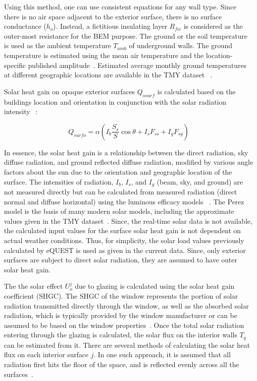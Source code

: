 Using this method, one can use consistent equations for any wall type.  Since there is no air space adjacent to the exterior surface, there is no surface conductance ($h_{o}$). Instead, a fictitious insulating layer $R_{fic}$ is considered as the outer-most resistance for the BEM purpose.
The ground or the soil temperature is used as the ambient temperature $T_{amb}$ of underground walls.  The ground temperature is estimated using the mean air temperature and the location-specific published amplitude~\citep{american20152015}. Estimated average monthly ground temperatures at different geographic locations are available in the TMY dataset ~\citep{marion1995user}.  

Solar heat gain on opaque exterior surfaces $Q_{osurf}$ is calculated based on the buildings location and orientation in conjunction with the solar radiation intensity ~\citep{doe2016energyplus}:  

\begin{equation}
Q_{surfo} = \alpha(I_b\frac{S_s}{S}\cos\theta + I_sF_{ss} + I_gF_{sg})
\end{equation}

In essence, the solar heat gain is a relationship between the direct radiation, sky diffuse radiation, and ground reflected diffuse radiation, modified by various angle factors about the sun due to the orientation and geographic location of the surface. The intensities of radiation, $I_b$, $I_s$, and $I_g$ (beam, sky, and ground) are not measured directly but can be calculated from measured radiation (direct normal and diffuse horizontal) using the luminous efficacy models ~\citep{perez1990modeling}.  The Perez model is the basis of many modern solar models, including the approximate values given in the TMY dataset~\citep{marion1995user}. %
Since, the real-time solar data is not available, the calculated input values for the surface solar heat gain is not dependent on actual weather conditions. Thus, for simplicity, the solar load values previously calculated by eQUEST is used as given in the current data. Since, only exterior surfaces are subject to direct solar radiation, they are assumed to have outer solar heat gain.

The the solar effect $U_o^j$ due to glazing is calculated using the solar heat gain coefficient (SHGC). The SHGC of the window represents the portion of solar radiation transmitted directly through the window, as well as the absorbed solar radiation, which is typically provided by the window manufacturer or can be assumed to be based on the window properties~\citep{american20132013}. Once the total solar radiation entering through the glazing is calculated, the solar flux on the interior walls $T_q$ can be estimated from it. There are several methods of calculating the solar heat flux on each interior surface $j$. In one such approach, it is assumed that all radiation first hits the floor of the space, and is reflected evenly across all the surfaces~\citep{o2010model}.


